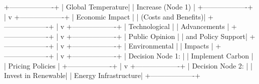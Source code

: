 +-------------------+
| Global Temperature|
| Increase (Node 1) |
+-------------------+
        |
        v
+-------------------+
| Economic Impact    |
| (Costs and Benefits)| 
+-------------------+
        |
        v
+-------------------+
| Technological     |
| Advancements       |
+-------------------+
        |
        v
+-------------------+
| Public Opinion     |
| and Policy Support|
+-------------------+
        |
        v
+-------------------+
| Environmental      |
| Impacts            |
+-------------------+
        |
        v
+-------------------+
| Decision Node 1:  |
| Implement Carbon  |
| Pricing Policies  |
+-------------------+
        |
        v
+-------------------+
| Decision Node 2:  |
| Invest in Renewable|
| Energy Infrastructure|
+-------------------+